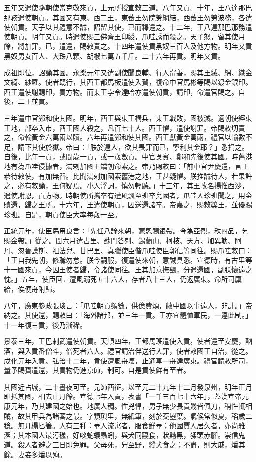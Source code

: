 \begin{pinyinscope}
五年又遣使隨朝使常克敬來貢，上元所授宣敕三道。八年又貢。十年，王八達那巴那務遣使朝貢。其國又有東、西二王，東蕃王勿院勞網結，西蕃王勿勞波務，各遣使朝貢。天子以其禮意不誠，詔留其使，已而釋還之。十二年，王八達那巴那務遣使朝貢。明年又貢。時遣使賜三佛齊王印綬，爪哇誘而殺之。天子怒，留其使月餘，將加罪，已，遣還，賜敕責之。十四年遣使貢黑奴三百人及他方物。明年又貢黑奴男女百人、大珠八顆、胡椒七萬五千斤。二十六年再貢。明年又貢。

成祖即位，詔諭其國。永樂元年又遣副使聞良輔、行人甯善，賜其王絨、綿、織金文綺、紗羅。使者既行，其西王都馬板遣使入賀，復命中官馬彬等賜以鍍金銀印。西王遣使謝賜印，貢方物。而東王孛令達哈亦遣使朝貢，請印，命遣官賜之。自後，二王並貢。

三年遣中官鄭和使其國。明年，西王與東王構兵，東王戰敗，國被滅。適朝使經東王地，部卒入市，西王國人殺之，凡百七十人。西王懼，遣使謝罪。帝賜敕切責之，命輸黃金六萬兩以贖。六年再遣鄭和使其國。西王獻黃金萬兩，禮官以輸數不足，請下其使於獄。帝曰：「朕於遠人，欲其畏罪而已，寧利其金耶？」悉捐之。自後，比年一貢，或間歲一貢，或一歲數貢。中官吳賓、鄭和先後使其國。時舊港地有為爪哇侵據者，滿剌加國王矯朝命索之。帝乃賜敕曰：「前中官尹慶還，言王恭待敕使，有加無替。比聞滿剌加國索舊港之地，王甚疑懼。朕推誠待人，若果許之，必有敕諭，王何疑焉。小人浮詞，慎勿輕聽。」十三年，其王改名揚惟西沙，遣使謝恩，貢方物。時朝使所攜卒有遭風飄至班卒兒國者，爪哇人珍班聞之，用金贖還，歸之王所。十六年，王遣使朝貢，因送還諸卒。帝嘉之，賜敕獎王，並優賜珍班。自是，朝貢使臣大率每歲一至。

正統元年，使臣馬用良言：「先任八諦來朝，蒙恩賜銀帶。今為亞烈，秩四品，乞賜金帶。」從之。閏六月遣古里、蘇門答剌、錫蘭山、柯枝、天方、加異勒、阿丹、忽魯謨斯、祖法兒、甘巴里、真臘使臣偕爪哇使臣郭信等同往。賜爪哇敕曰：「王自我先朝，修職勿怠。朕今嗣服，復遣使來朝，意誠具悉。宣德時，有古里等十一國來貢，今因王使者歸，令諸使同往。王其加意撫颻，分遣還國，副朕懷遠之忱。」五年，使臣回，遭風溺死五十六人，存者八十三人，仍返廣東。命所司廩給，俟便舟附歸。

八年，廣東參政張琰言：「爪哇朝貢頻數，供億費煩，敝中國以事遠人，非計。」帝納之。其使還，賜敕曰：「海外諸邦，並三年一貢。王亦宜體恤軍民，一遵此制。」十一年復三貢，後乃漸稀。

景泰三年，王巴剌武遣使朝貢。天順四年，王都馬班遣使入貢。使者還至安慶，酗酒，與入貢番僧斗，僧死者六人。禮官請治伴送行人罪，使者敕國王自治，從之。成化元年入貢。弘治十二年，貢使遭風舟壞，止通事一舟達廣東。禮官請敕所司，量予賜賚遣還，其貢物仍進京師，制可。自是貢使鮮有至者。

其國近占城，二十晝夜可至。元師西征，以至元二十九年十二月發泉州，明年正月即抵其國，相去止月餘。宣德七年入貢，表書「一千三百七十六年」，蓋漢宣帝元康元年，乃其建國之始也。地廣人稠。性兇悍，男子無少長貴賤皆佩刀，稍忤輒相賊，故其甲兵為諸蕃之最。字類瑣里，無紙筆，刻於茭曌葉。氣候常似夏，稻歲二稔。無几榻匕箸。人有三種：華人流寓者，服食鮮華；他國賈人居久者，亦尚雅潔；其本國人最污穢，好啖蛇蟻蟲蚓，與犬同寢食，狀黝黑，猱頭赤腳。崇信鬼道。殺人者避之三日即免罪。父母死，舁至野，縱犬食之；不盡，則大戚，燔其餘。妻妾多燔以殉。


\end{pinyinscope}
